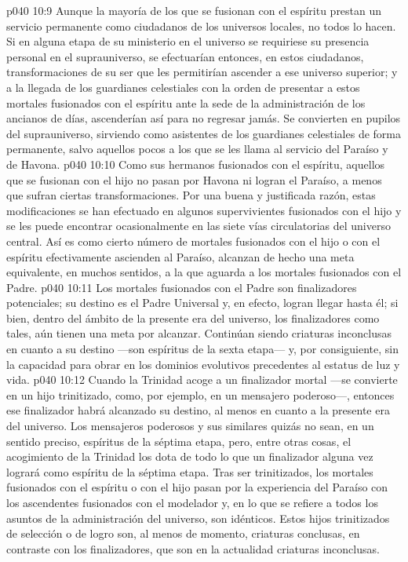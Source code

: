 \vs p040 10:9 \pc Aunque la mayoría de los que se fusionan con el espíritu prestan un servicio permanente como ciudadanos de los universos locales, no todos lo hacen. Si en alguna etapa de su ministerio en el universo se requiriese su presencia personal en el suprauniverso, se efectuarían entonces, en estos ciudadanos, transformaciones de su ser que les permitirían ascender a ese universo superior; y a la llegada de los guardianes celestiales con la orden de presentar a estos mortales fusionados con el espíritu ante la sede de la administración de los ancianos de días, ascenderían así para no regresar jamás. Se convierten en pupilos del suprauniverso, sirviendo como asistentes de los guardianes celestiales de forma permanente, salvo aquellos pocos a los que se les llama al servicio del Paraíso y de Havona.
\vs p040 10:10 Como sus hermanos fusionados con el espíritu, aquellos que se fusionan con el hijo no pasan por Havona ni logran el Paraíso, a menos que sufran ciertas transformaciones. Por una buena y justificada razón, estas modificaciones se han efectuado en algunos supervivientes fusionados con el hijo y se les puede encontrar ocasionalmente en las siete vías circulatorias del universo central. Así es como cierto número de mortales fusionados con el hijo o con el espíritu efectivamente ascienden al Paraíso, alcanzan de hecho una meta equivalente, en muchos sentidos, a la que aguarda a los mortales fusionados con el Padre.
\vs p040 10:11 Los mortales fusionados con el Padre son finalizadores potenciales; su destino es el Padre Universal y, en efecto, logran llegar hasta él; si bien, dentro del ámbito de la presente era del universo, los finalizadores como tales, aún tienen una meta por alcanzar. Continúan siendo criaturas inconclusas en cuanto a su destino ---son espíritus de la sexta etapa--- y, por consiguiente, sin la capacidad para obrar en los dominios evolutivos precedentes al estatus de luz y vida.
\vs p040 10:12 Cuando la Trinidad acoge a un finalizador mortal ---se convierte en un hijo trinitizado, como, por ejemplo, en un mensajero poderoso---, entonces ese finalizador habrá alcanzado su destino, al menos en cuanto a la presente era del universo. Los mensajeros poderosos y sus similares quizás no sean, en un sentido preciso, espíritus de la séptima etapa, pero, entre otras cosas, el acogimiento de la Trinidad los dota de todo lo que un finalizador alguna vez logrará como espíritu de la séptima etapa. Tras ser trinitizados, los mortales fusionados con el espíritu o con el hijo pasan por la experiencia del Paraíso con los ascendentes fusionados con el modelador y, en lo que se refiere a todos los asuntos de la administración del universo, son idénticos. Estos hijos trinitizados de selección o de logro son, al menos de momento, criaturas conclusas, en contraste con los finalizadores, que son en la actualidad criaturas inconclusas.
